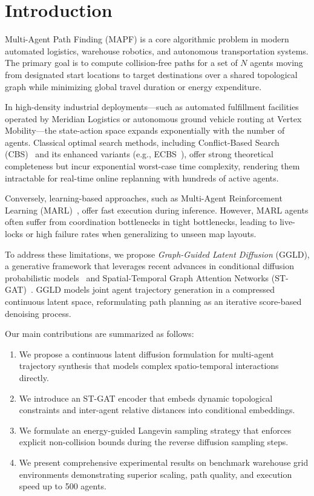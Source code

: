 \documentclass[runningheads]{llncs}
\begin{document}
\section{Introduction}
Multi-Agent Path Finding (MAPF) is a core algorithmic problem in modern automated logistics, warehouse robotics, and autonomous transportation systems. The primary goal is to compute collision-free paths for a set of $N$ agents moving from designated start locations to target destinations over a shared topological graph while minimizing global travel duration or energy expenditure.

In high-density industrial deployments—such as automated fulfillment facilities operated by Meridian Logistics or autonomous ground vehicle routing at Vertex Mobility—the state-action space expands exponentially with the number of agents. Classical optimal search methods, including Conflict-Based Search (CBS)~\cite{sharon2015cbs} and its enhanced variants (e.g., ECBS~\cite{barer2014ecbs}), offer strong theoretical completeness but incur exponential worst-case time complexity, rendering them intractable for real-time online replanning with hundreds of active agents.

Conversely, learning-based approaches, such as Multi-Agent Reinforcement Learning (MARL)~\cite{sartoretti2019primal}, offer fast execution during inference. However, MARL agents often suffer from coordination bottlenecks in tight bottlenecks, leading to live-locks or high failure rates when generalizing to unseen map layouts.

To address these limitations, we propose \emph{Graph-Guided Latent Diffusion} (GGLD), a generative framework that leverages recent advances in conditional diffusion probabilistic models~\cite{ho2020ddpm} and Spatial-Temporal Graph Attention Networks (ST-GAT)~\cite{velickovic2018gat}. GGLD models joint agent trajectory generation in a compressed continuous latent space, reformulating path planning as an iterative score-based denoising process.

Our main contributions are summarized as follows:
\begin{enumerate}
\item We propose a continuous latent diffusion formulation for multi-agent trajectory synthesis that models complex spatio-temporal interactions directly.
\item We introduce an ST-GAT encoder that embeds dynamic topological constraints and inter-agent relative distances into conditional embeddings.
\item We formulate an energy-guided Langevin sampling strategy that enforces explicit non-collision bounds during the reverse diffusion sampling steps.
\item We present comprehensive experimental results on benchmark warehouse grid environments demonstrating superior scaling, path quality, and execution speed up to 500 agents.
\end{enumerate}
\end{document}
